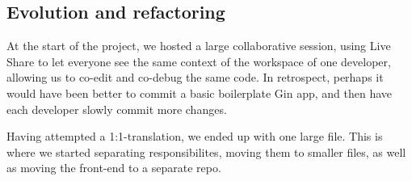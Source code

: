 \subsection{Evolution and refactoring}

At the start of the project, we hosted a large collaborative session, using Live Share \cite{tool:live-share} to let everyone see the same context of the workspace of one developer, allowing us to co-edit and co-debug the same code. In retrospect, perhaps it would have been better to commit a basic boilerplate Gin app, and then have each developer slowly commit more changes.

Having attempted a 1:1-translation, we ended up with one large file. This is where we started separating responsibilites, moving them to smaller files, as well as moving the front-end to a separate repo.

